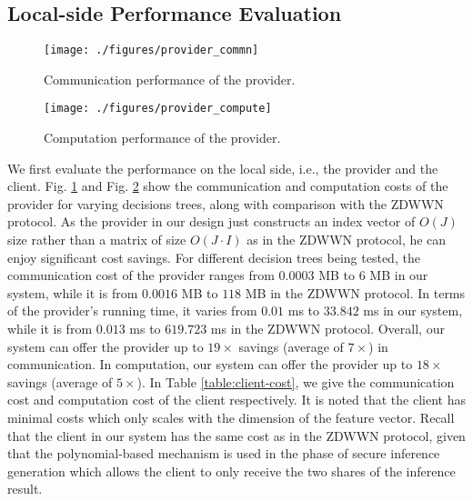 \documentclass[10pt,journal,compsoc]{IEEEtran}
\begin{document}
\subsection{Local-side Performance Evaluation}
%



\iffalse

\begin{figure}[t!]
\centerline{\texttt{[image: ./figures/client\_commn]}}
\caption{Communication performance of the client.}
\label{fig:client_commn_cost}
\end{figure}


\begin{figure}[t!]
\centerline{\texttt{[image: ./figures/client\_compute]}}
\caption{Computation performance of the client.}
\label{fig:client_compute_cost}
\end{figure}
\fi




\begin{figure}[t!]
\centerline{\texttt{[image: ./figures/provider\_commn]}}
\caption{Communication performance of the provider.}
\label{fig:provider_commn_cost}
\end{figure}


\begin{figure}[t!]
\centerline{\texttt{[image: ./figures/provider\_compute]}}
\caption{Computation performance of the provider.}
\label{fig:provider_compute_cost}
\end{figure}






We first evaluate the performance on the local side, i.e., the provider and the client.
%
Fig. \ref{fig:provider_commn_cost} and Fig. \ref{fig:provider_compute_cost} show the communication and computation costs of the provider for varying decisions trees, along with comparison with the ZDWWN protocol.
%
As the provider in our design just constructs an index vector of $O(J)$ size rather than a matrix of size $O(J\cdot I)$ as in the ZDWWN protocol, he can enjoy significant cost savings.
%
For different decision trees being tested, the communication cost of the provider ranges from $0.0003$ MB to $6$ MB in our system, while it is from $0.0016$ MB to $118$ MB in the ZDWWN protocol.
%
In terms of the provider's running time, it varies from $0.01$ ms to $33.842$ ms in our system, while it is from $0.013$ ms to $619.723$ ms in the ZDWWN protocol.
%
Overall, our system can offer the provider up to $19 \times$ savings (average of $7 \times$) in communication.
%
In computation, our system can offer the provider up to $18 \times$ savings (average of $5 \times$).
%
In Table \ref{table:client-cost}, we give the communication cost and computation cost of the client respectively.
%
It is noted that the client has minimal costs which only scales with the dimension of the feature vector.
%
Recall that the client in our system has the same cost as in the ZDWWN protocol, given that the polynomial-based mechanism is used in the phase of secure inference generation which allows the client to only receive the two shares of the inference result.
\end{document}

